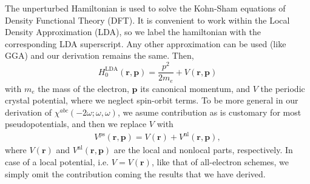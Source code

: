 \documentclass[floatfix,prb,aps,superscriptaddress,showpacs,11pt,preprint,letterpaper]{revtex4}
\begin{document}
The unperturbed Hamiltonian 
is used to solve the Kohn-Sham equations\cite{kohnPR65} of Density  
Functional Theory (DFT). It is convenient to work within the Local 
Density Approximation (LDA), so we label the hamiltonian with the corresponding  
LDA superscript. Any other approximation can be used (like GGA) and our 
derivation remains the same. Then,
\begin{equation}\label{h0}
H^{\mathrm{LDA}}_{0}(\mathbf{r},\mathbf{p})
=\frac{p^{2}}{2m_e}+V(\mathbf{r},\mathbf{p})
\end{equation}
with $m_e$ the mass of the electron, $\mathbf{p}$ its canonical momentum, and 
$V$
 the periodic crystal potential, where we neglect spin-orbit terms.
To be more general in our derivation of
$\chi^{abc}(-2\omega;\omega,\omega)$, we asume
contribution as is customary for most
pseudopotentials, and then we replace $V$ with
\begin{align}\label{ps}
V^{\mathrm{ps}}(\mathbf{r},\mathbf{p})=V(\mathbf{r})+V^{\mathrm{nl}}(\mathbf{r},\mathbf{p})
,
\end{align}
where 
$V(\mathbf{r})$ and $V^{\mathrm{nl}}(\mathbf{r},\mathbf{p})$  are the local and nonlocal parts, 
 respectively.
In case of
a local potential, i.e. $V= V(\mathbf{r})$, 
like that of all-electron schemes, 
we simply omit the contribution coming
the results that we have derived.
\end{document}
